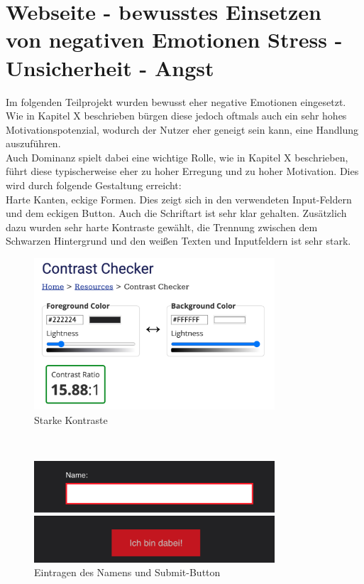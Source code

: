 \documentclass[./dokumentation.tex]{subfiles}
\begin{document}
\section{Webseite - bewusstes Einsetzen von negativen Emotionen Stress - Unsicherheit - Angst}
Im folgenden Teilprojekt wurden bewusst eher negative Emotionen eingesetzt. Wie in Kapitel X beschrieben bürgen diese jedoch oftmals auch ein sehr hohes Motivationspotenzial, wodurch der Nutzer eher geneigt sein kann, eine Handlung auszuführen.\\
Auch Dominanz spielt dabei eine wichtige Rolle, wie in Kapitel X beschrieben, führt diese typischerweise eher zu hoher Erregung und zu hoher Motivation. Dies wird durch folgende Gestaltung erreicht:\\
Harte Kanten, eckige Formen. Dies zeigt sich in den verwendeten Input-Feldern und dem eckigen Button. Auch die Schriftart ist sehr klar gehalten. Zusätzlich dazu wurden sehr harte Kontraste gewählt, die Trennung zwischen dem Schwarzen Hintergrund und den weißen Texten und Inputfeldern ist sehr stark.

\begin{figure}[h]
    \centering
    \includegraphics[width=0.8\textwidth]{bilder/contrast.png}
    \caption{Starke Kontraste} %
    \label{fig12:contrast}
\end{figure}\\

\begin{figure}[h]
    \centering
    \includegraphics[width=0.8\textwidth]{bilder/name-bin-dabei.png}
    \caption{Eintragen des Namens und Submit-Button} %
    \label{fig13:name}
\end{figure}\\
\end{document}
